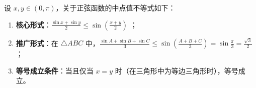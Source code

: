 \begin{statementbox}
设 $x, y \in (0, \pi)$，关于正弦函数的中点值不等式如下：
\begin{enumerate}
    \item \textbf{核心形式}：$\frac{\sin x + \sin y}{2} \leqslant \sin\left(\frac{x+y}{2}\right)$ ；
    \item \textbf{推广形式}：在 $\triangle ABC$ 中，$\frac{\sin A + \sin B + \sin C}{3} \leqslant \sin\left(\frac{A+B+C}{3}\right) = \sin\frac{\pi}{3} = \frac{\sqrt{3}}{2}$ ；
    \item \textbf{等号成立条件}：当且仅当 $x = y$ 时（在三角形中为等边三角形时），等号成立。
\end{enumerate}
\end{statementbox}